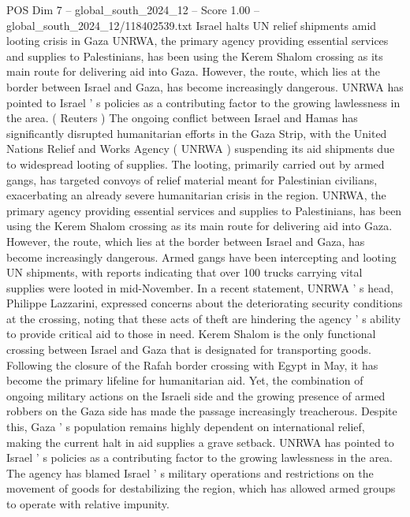 \begin{textsample}{POS Dim 7 – global\_south\_2024\_12 – Score 1.00 – global\_south\_2024\_12/118402539.txt}  \label{ex:f7_pos_159}
Israel halts UN relief shipments amid looting crisis in Gaza UNRWA, the primary agency providing essential services and supplies to Palestinians, has been using the Kerem Shalom crossing as its main route for delivering aid into Gaza.
However, the route, which lies at the border between Israel and Gaza, has become increasingly dangerous.
UNRWA has pointed to Israel ' s policies as a contributing factor to the growing lawlessness in the area. ( Reuters ) The ongoing conflict between Israel and Hamas has significantly disrupted humanitarian efforts in the Gaza Strip, with the United Nations Relief and Works Agency ( UNRWA ) suspending its aid shipments due to widespread looting of supplies.
The looting, primarily carried out by armed gangs, has targeted convoys of relief material meant for Palestinian civilians, exacerbating an already severe humanitarian crisis in the region.
UNRWA, the primary agency providing essential services and supplies to Palestinians, has been using the Kerem Shalom crossing as its main route for delivering aid into Gaza.
However, the route, which lies at the border between Israel and Gaza, has become increasingly dangerous.
Armed gangs have been intercepting and looting UN shipments, with reports indicating that over 100 trucks carrying vital supplies were looted in mid-November.
In a recent statement, UNRWA ' s head, Philippe Lazzarini, expressed concerns about the deteriorating security conditions at the crossing, noting that these acts of theft are hindering the agency ' s ability to provide critical aid to those in need.
Kerem Shalom is the only functional crossing between Israel and Gaza that is designated for transporting goods.
Following the closure of the Rafah border crossing with Egypt in May, it has become the primary lifeline for humanitarian aid.
Yet, the combination of ongoing military actions on the Israeli side and the growing presence of armed robbers on the Gaza side has made the passage increasingly treacherous.
Despite this, Gaza ' s population remains highly dependent on international relief, making the current halt in aid supplies a grave setback.
UNRWA has pointed to Israel ' s policies as a contributing factor to the growing lawlessness in the area.
The agency has blamed Israel ' s military operations and restrictions on the movement of goods for destabilizing the region, which has allowed armed groups to operate with relative impunity.

\end{textsample}
